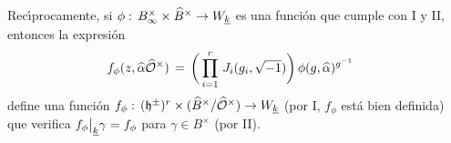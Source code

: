 Rec\'{\i}procamente, si
\begin{math}
	\phi:\,{B}_{\infty}^{\times}\times\widehat{B}^{\times}\rightarrow W_{\underline{k}}
\end{math}
es una funci\'{o}n que cumple con I y II, entonces la expresi\'{o}n
\begin{align*}
	f_{\phi}(z,\widehat{\alpha}\widehat{\mathcal{O}}^{\times}) & \,=\,
		\bigg(\prod_{i=1}^{r}\,J_{i}(g_{i},\sqrt{-1})\bigg)\,
			\phi(g,\widehat{\alpha})^{g^{-1}}
\end{align*}
%
define una funci\'{o}n
\begin{math}
	f_{\phi}:\,(\mathfrak{h}^{\pm})^{r}\times(\widehat{B}^{\times}/\widehat{\mathcal{O}}^{\times})
		\rightarrow W_{\underline{k}}
\end{math}
(por I, $f_{\phi}$ est\'{a} bien definida) que verifica
$f_{\phi}\big|_{\underline{k}}{\gamma}=f_{\phi}$ para
$\gamma\in B^{\times}$ (por II).

